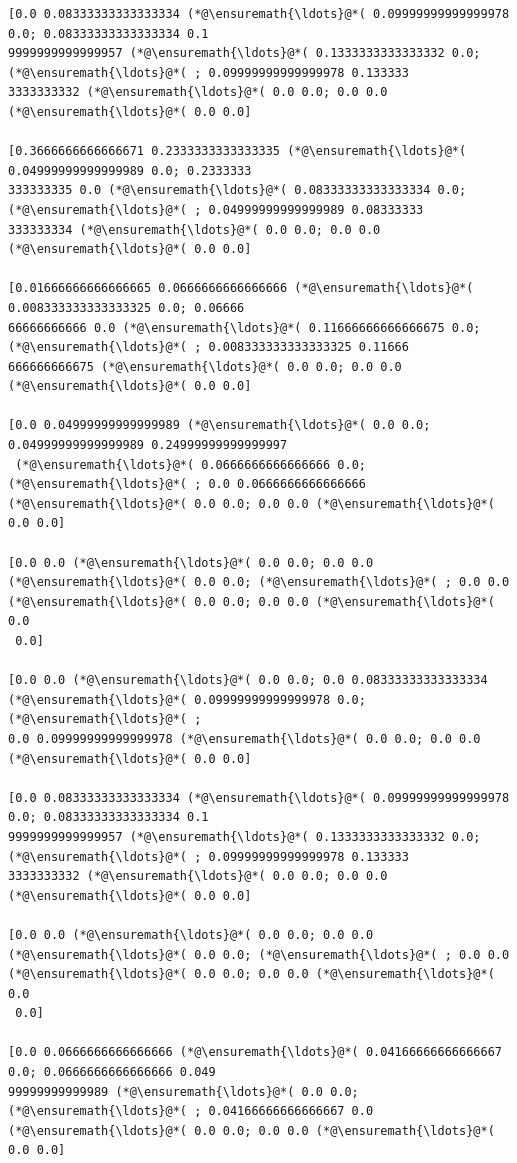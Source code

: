\documentclass[12pt,a4paper]{article}
\begin{document}
\begin{lstlisting}
[0.0 0.08333333333333334 (*@\ensuremath{\ldots}@*( 0.09999999999999978 0.0; 0.08333333333333334 0.1
9999999999999957 (*@\ensuremath{\ldots}@*( 0.1333333333333332 0.0; (*@\ensuremath{\ldots}@*( ; 0.09999999999999978 0.133333
3333333332 (*@\ensuremath{\ldots}@*( 0.0 0.0; 0.0 0.0 (*@\ensuremath{\ldots}@*( 0.0 0.0]

[0.3666666666666671 0.2333333333333335 (*@\ensuremath{\ldots}@*( 0.04999999999999989 0.0; 0.2333333
333333335 0.0 (*@\ensuremath{\ldots}@*( 0.08333333333333334 0.0; (*@\ensuremath{\ldots}@*( ; 0.04999999999999989 0.08333333
333333334 (*@\ensuremath{\ldots}@*( 0.0 0.0; 0.0 0.0 (*@\ensuremath{\ldots}@*( 0.0 0.0]

[0.01666666666666665 0.0666666666666666 (*@\ensuremath{\ldots}@*( 0.008333333333333325 0.0; 0.06666
66666666666 0.0 (*@\ensuremath{\ldots}@*( 0.11666666666666675 0.0; (*@\ensuremath{\ldots}@*( ; 0.008333333333333325 0.11666
666666666675 (*@\ensuremath{\ldots}@*( 0.0 0.0; 0.0 0.0 (*@\ensuremath{\ldots}@*( 0.0 0.0]

[0.0 0.04999999999999989 (*@\ensuremath{\ldots}@*( 0.0 0.0; 0.04999999999999989 0.24999999999999997
 (*@\ensuremath{\ldots}@*( 0.0666666666666666 0.0; (*@\ensuremath{\ldots}@*( ; 0.0 0.0666666666666666 (*@\ensuremath{\ldots}@*( 0.0 0.0; 0.0 0.0 (*@\ensuremath{\ldots}@*( 
0.0 0.0]

[0.0 0.0 (*@\ensuremath{\ldots}@*( 0.0 0.0; 0.0 0.0 (*@\ensuremath{\ldots}@*( 0.0 0.0; (*@\ensuremath{\ldots}@*( ; 0.0 0.0 (*@\ensuremath{\ldots}@*( 0.0 0.0; 0.0 0.0 (*@\ensuremath{\ldots}@*( 0.0
 0.0]

[0.0 0.0 (*@\ensuremath{\ldots}@*( 0.0 0.0; 0.0 0.08333333333333334 (*@\ensuremath{\ldots}@*( 0.09999999999999978 0.0; (*@\ensuremath{\ldots}@*( ; 
0.0 0.09999999999999978 (*@\ensuremath{\ldots}@*( 0.0 0.0; 0.0 0.0 (*@\ensuremath{\ldots}@*( 0.0 0.0]

[0.0 0.08333333333333334 (*@\ensuremath{\ldots}@*( 0.09999999999999978 0.0; 0.08333333333333334 0.1
9999999999999957 (*@\ensuremath{\ldots}@*( 0.1333333333333332 0.0; (*@\ensuremath{\ldots}@*( ; 0.09999999999999978 0.133333
3333333332 (*@\ensuremath{\ldots}@*( 0.0 0.0; 0.0 0.0 (*@\ensuremath{\ldots}@*( 0.0 0.0]

[0.0 0.0 (*@\ensuremath{\ldots}@*( 0.0 0.0; 0.0 0.0 (*@\ensuremath{\ldots}@*( 0.0 0.0; (*@\ensuremath{\ldots}@*( ; 0.0 0.0 (*@\ensuremath{\ldots}@*( 0.0 0.0; 0.0 0.0 (*@\ensuremath{\ldots}@*( 0.0
 0.0]

[0.0 0.0666666666666666 (*@\ensuremath{\ldots}@*( 0.04166666666666667 0.0; 0.0666666666666666 0.049
99999999999989 (*@\ensuremath{\ldots}@*( 0.0 0.0; (*@\ensuremath{\ldots}@*( ; 0.04166666666666667 0.0 (*@\ensuremath{\ldots}@*( 0.0 0.0; 0.0 0.0 (*@\ensuremath{\ldots}@*( 
0.0 0.0]


\end{lstlisting}
\end{document}
